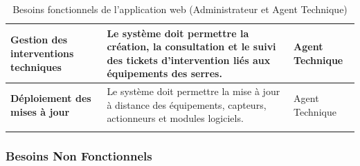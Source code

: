 {\begin{longtable}{|>{\raggedright\arraybackslash}p{4cm}|>{\raggedright\arraybackslash}p{9cm}|>{\raggedright\arraybackslash}p{3cm}|}
		
		\textbf{Gestion des interventions techniques} &
		Le système doit permettre la création, la consultation et le suivi des tickets d’intervention liés aux équipements des serres. &
		Agent Technique
		\\ \hline
		
		\rowcolor[HTML]{EFEFEF}
		
		
		\textbf{Déploiement des mises à jour} &
		Le système doit permettre la mise à jour à distance des équipements, capteurs, actionneurs et modules logiciels. &
		Agent Technique
		\\ \hline
		
		\caption{Besoins fonctionnels de l’application web (Administrateur et Agent Technique)}
		\label{tab:bf-web-combined}
		
	\end{longtable}
}
\endgroup
\subsubsection{Besoins Non Fonctionnels}

\renewcommand{\arraystretch}{1.5}

